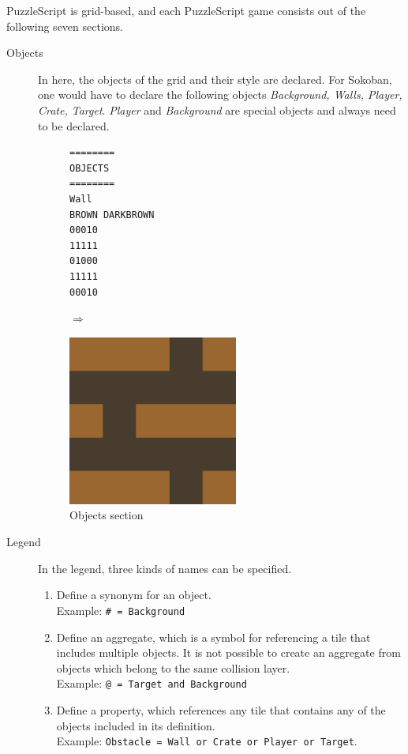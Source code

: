 PuzzleScript is grid-based, and each PuzzleScript game consists out of the following seven sections.
\begin{description}
    \item[Objects] In here, the objects of the grid and their style are declared. For Sokoban, one would have to declare the following objects \textit{Background, Walls, Player, Crate, Target}. \textit{Player} and \textit{Background} are special objects and always need to be declared. \hfill
        \begin{figure}[!htbp]
    \begin{minipage}{0.4\textwidth}
        \centering
    \begin{lstlisting}
========
OBJECTS
========
Wall
BROWN DARKBROWN
00010
11111
01000
11111
00010
    \end{lstlisting}
    
    \end{minipage} \qquad $\Longrightarrow$ \hfill
    \begin{minipage}{0.4\textwidth}
        
        \includegraphics[width=0.55\textwidth]{figures/wallimg.png}
    \end{minipage}
    \caption{Objects section}
    \end{figure}



    \item[Legend] In the legend,  three kinds of names can be specified.
        \begin{enumerate}
            \item Define a synonym for an object. \hfill \\
            Example: \lstinline{# = Background}
            \item Define an aggregate, which is a symbol for referencing a tile that includes multiple objects. It is not possible to create an aggregate from objects which belong to the same collision layer. \hfill \\
            Example: \lstinline{@ = Target and Background}
            \item Define a property, which references any tile that contains any of the objects included in its definition. \hfill \\
            Example: \lstinline{Obstacle = Wall or Crate or Player or Target}.
        \end{enumerate}
        

\end{description}
